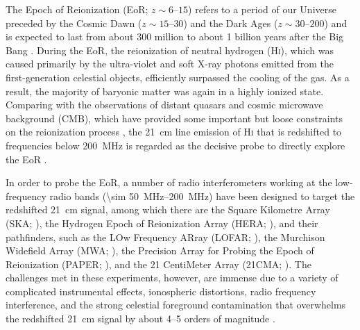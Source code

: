 \documentclass[modern]{aastex62}
\newcommand{\Hi}{H\textsc{i}}
\begin{document}
The Epoch of Reionization (EoR; $z \sim \numrange{6}{15}$) refers to
a period of our Universe preceded by the Cosmic Dawn
($z \sim \numrange{15}{30}$) and the Dark Ages ($z \sim \numrange{30}{200}$)
and is expected to last from about 300 million to about 1 billion years
after the Big Bang \citep[see][and references therein]{koopmans2015rev}.
During the EoR, the reionization of neutral hydrogen (\Hi), which was
caused primarily by the ultra-violet and soft X-ray photons emitted from
the first-generation celestial objects, efficiently surpassed the cooling
of the gas.
As a result, the majority of baryonic matter was again in a highly ionized
state.
Comparing with the observations of distant quasars and cosmic microwave
background (CMB), which have provided some important but loose constraints
on the reionization process \citep[see][for a review]{fan2006rev},
the 21~cm line emission of \Hi{} that is redshifted to frequencies below
\SI{200}{\MHz} is regarded as the decisive probe to directly explore the EoR
\citep[see][for reviews]{furlanetto2006rev,zaroubi2013rev,furlanetto2016rev}.

In order to probe the EoR, a number of radio interferometers working
at the low-frequency radio bands (\SIrange{\sim 50}{200}{\MHz}) have been
designed to target the redshifted 21~cm signal, among which there are
the Square Kilometre Array (SKA; \citealt{mellema2013rev,koopmans2015rev}),
the Hydrogen Epoch of Reionization Array (HERA; \citealt{deboer2017}),
and their pathfinders, such as
the LOw Frequency ARray (LOFAR; \citealt{vanHaarlem2013}),
the Murchison Widefield Array (MWA; \citealt{bowman2013,tingay2013}),
the Precision Array for Probing the Epoch of Reionization
(PAPER; \citealt{parsons2010}),
and the 21 CentiMeter Array (21CMA; \citealt{zheng2016}).
The challenges met in these experiments, however, are immense
due to a variety of complicated instrumental effects,
ionospheric distortions, radio frequency interference, and the
strong celestial foreground contamination that overwhelms the
redshifted 21~cm signal by about \numrange{4}{5} orders of magnitude
\citep[see][for a review]{morales2010rev}.
\end{document}
